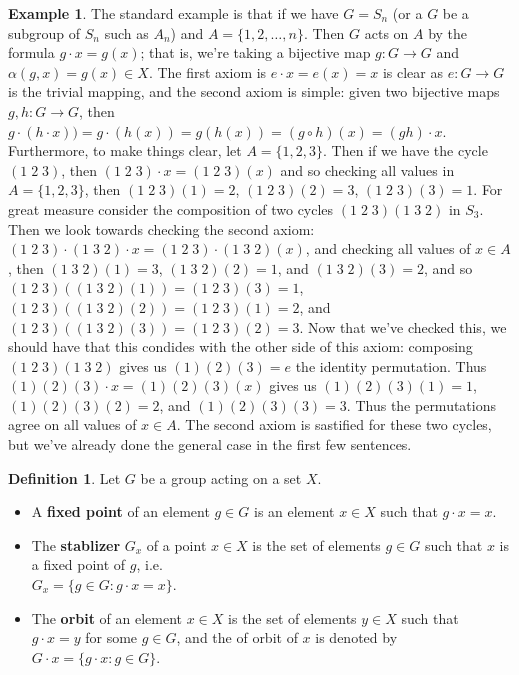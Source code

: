 \documentclass[9pt,reqno]{amsart}
\theoremstyle{definition}
\newtheorem{defi}{Definition}[section]
\newtheorem{ex}{Example}[section]
\begin{document}
\begin{ex}
The standard example is that if we have $G = S_n$ (or a $G$ be a subgroup of $S_n$ such as $A_n$) and $A = \{ 1, 2, \ldots, n \}$. Then $G$ acts on $A$ by the formula $g \cdot x = g(x)$; that is, we're taking a bijective map $g \colon G \to G$ and $\alpha (g, x) = g(x) \in X$. The first axiom is $e \cdot x = e(x) = x$ is clear as $e \colon G \to G$ is the trivial mapping, and the second axiom is simple: given two bijective maps $g, h \colon G \to G$, then $g \cdot (h \cdot x)) = g \cdot (h(x)) = g(h(x)) = (g \circ h)(x) = (gh)\cdot x$. Furthermore, to make things clear, let $A = \{1, 2,3 \}$. Then if we have the cycle $(1 \; 2 \; 3) $, then $(1 \; 2 \; 3)\cdot x = (1 \; 2 \; 3)(x)$ and so checking all values in $A = \{1, 2, 3 \}$, then $(1 \; 2 \; 3) (1) = 2$, $(1 \; 2 \; 3) (2) = 3$, $(1 \; 2 \; 3) (3) = 1$. For great measure consider the composition of two cycles $( 1 \; 2 \; 3) ( 1 \; 3 \; 2)$ in $S_3$. Then we look towards checking the second axiom: $(1 \; 2 \; 3) \cdot  (1 \; 3 \; 2) \cdot x  = (1 \; 2 \; 3) \cdot (1 \; 3 \; 2) (x)$, and checking all values of $x \in A$, then $(1 \; 3 \; 2) (1) = 3$, $(1 \; 3 \; 2) (2) = 1$, and $(1 \; 3 \; 2) (3) = 2$, and so $ (1 \; 2 \; 3) ((1 \; 3 \; 2) (1)) = (1 \; 2 \; 3) (3) = 1$, $ (1 \; 2 \; 3) ((1 \; 3 \; 2) (2)) = (1 \; 2 \; 3) (1) = 2$, and $ (1 \; 2 \; 3) ((1 \; 3 \; 2) (3)) = (1 \; 2 \; 3) (2) = 3$. Now that we've checked this, we should have that this condides with the other side of this axiom: composing $( 1 \; 2 \; 3) ( 1 \; 3 \; 2)$ gives us $(1) (2) (3) = e$ the identity permutation. Thus $(1) (2) (3) \cdot x = (1) (2) (3)(x)$ gives us $(1) (2) (3) (1) = 1$, $(1) (2) (3) (2) = 2$, and $(1) (2) (3) (3) = 3$. Thus the permutations agree on all values of $x \in A$. The second axiom is sastified for  these two cycles, but we've already done the general case in the first few sentences. 
\end{ex}
\begin{defi}Let $G$ be a group acting on a set $X$. 
\begin{itemize}
	\item A \textbf{fixed point} of an element $g \in G$ is an element $x \in X$ such that $g \cdot x = x$.
	\item The \textbf{stablizer}  $G_x$ of a point $x \in X$ is the set of elements $g \in G$ such that $x$ is a fixed point of $g$, i.e. \\ $G_x = \{g \in G \colon g \cdot x = x \}$. 
	\item The \textbf{orbit} of an element $x \in X$ is the set of elements $y \in X$ such that $g \cdot x = y$ for some $g \in G$, and the of orbit of $x$ is denoted by $G \cdot x = \{ g \cdot x \colon g \in G \}$. 
\end{itemize}
\end{defi}
\end{document}

